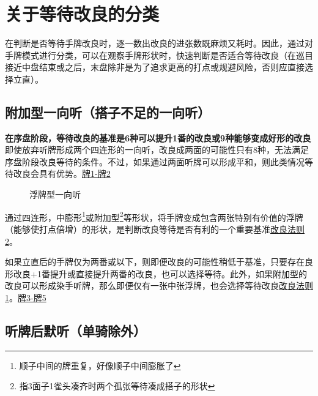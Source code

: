 \section{关于等待改良的分类}
在判断是否等待手牌改良时，逐一数出改良的进张数既麻烦又耗时。因此，通过对手牌模式进行分类，可以在观察手牌形状时，快速判断是否适合等待改良（在巡目接近中盘结束或之后，末盘除非是为了追求更高的打点或规避风险，否则应直接选择立直）。

\subsection{附加型一向听（搭子不足的一向听）}

\textbf{在序盘阶段，等待改良的基准是6种可以提升1番的改良或9种能够变成好形的改良}
即使放弃听牌形成两个四连形的一向听，改良成两面的可能性只有8种，无法满足序盘阶段改良等待的条件。不过，如果通过两面听牌可以形成平和，则此类情况等待改良会具有优势。\hyperref[lec3:pai1-5]{牌1-牌2}

\begin{figure}
    \caption{浮牌型一向听} \label{lec3:pai1-5}
    \par\bigskip
    \par\bigskip
    \par\bigskip
    \par\bigskip
\end{figure}

通过四连形，中膨形\footnote{顺子中间的牌重复，好像顺子中间膨胀了}或附加型\footnote{指3面子1雀头凑齐时两个孤张等待凑成搭子的形状}等形状，将手牌变成包含两张特别有价值的浮牌（能够使打点倍增）的形状，是判断改良等待是否有利的一个重要基准\hyperref[lec3:rule2]{改良法则2}。

如果立直后的手牌仅为两番或以下，则即便改良的可能性稍低于基准，只要存在良形改良+1番提升或直接提升两番的改良，也可以选择等待。此外，如果附加型的改良可以形成染手听牌，那么即便仅有一张中张浮牌，也会选择等待改良\hyperref[lec3:rule1]{改良法则1}。\hyperref[lec3:pai1-5]{牌3-牌5}


\subsection{听牌后默听（单骑除外）}

